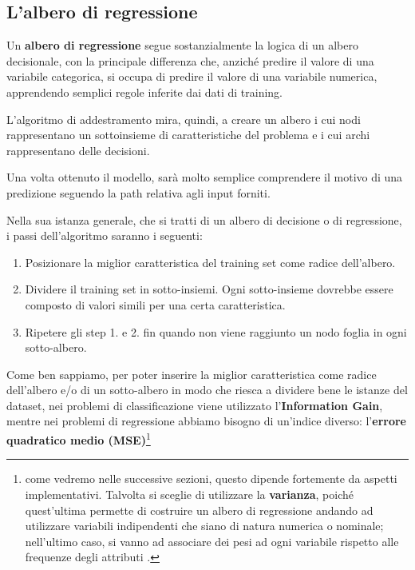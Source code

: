 \documentclass[a4paper, 11pt, oneside]{report}
\begin{document}
                \subsection{L'albero di regressione}
                Un \textbf{albero di regressione} segue sostanzialmente la logica di un albero decisionale, con la principale
                differenza che, anziché predire il valore di una variabile categorica, si occupa di predire il valore di
                una variabile numerica, apprendendo semplici regole inferite dai dati di training.
                \par \noindent L'algoritmo di addestramento mira, quindi, a creare un albero i cui nodi rappresentano un sottoinsieme
                di caratteristiche del problema e i cui archi rappresentano delle decisioni.
                \par \noindent Una volta ottenuto il modello, sarà molto semplice comprendere il motivo di una predizione
                seguendo la path relativa agli input forniti.\\
                \par \noindent Nella sua istanza generale, che si tratti di un albero di decisione o di regressione, i
                passi dell'algoritmo saranno i seguenti:
                \begin{enumerate}
                    \item Posizionare la miglior caratteristica del training set come radice dell'albero.
                    \item Dividere il training set in sotto-insiemi. Ogni sotto-insieme dovrebbe essere composto di valori
                    simili per una certa caratteristica.
                    \item Ripetere gli step 1. e 2. fin quando non viene raggiunto un nodo foglia in ogni sotto-albero.
                \end{enumerate}
                \medskip
                \par \noindent Come ben sappiamo, per poter inserire la miglior caratteristica come radice dell'albero e/o
                di un sotto-albero in modo che riesca a dividere bene le istanze del dataset, nei problemi di classificazione
                viene utilizzato l'\textbf{Information Gain}, mentre nei problemi di regressione abbiamo bisogno di un'indice
                diverso: l'\textbf{errore quadratico medio (MSE)}\footnote{come vedremo nelle
                successive sezioni, questo dipende fortemente da aspetti implementativi. Talvolta si sceglie di utilizzare
                la \textbf{varianza}, poiché quest'ultima permette di costruire un albero di regressione andando ad utilizzare
                variabili indipendenti che siano di natura numerica o nominale; nell'ultimo caso, si vanno ad associare dei
                pesi ad ogni variabile rispetto alle frequenze degli attributi \cite{8}.}
\end{document}

